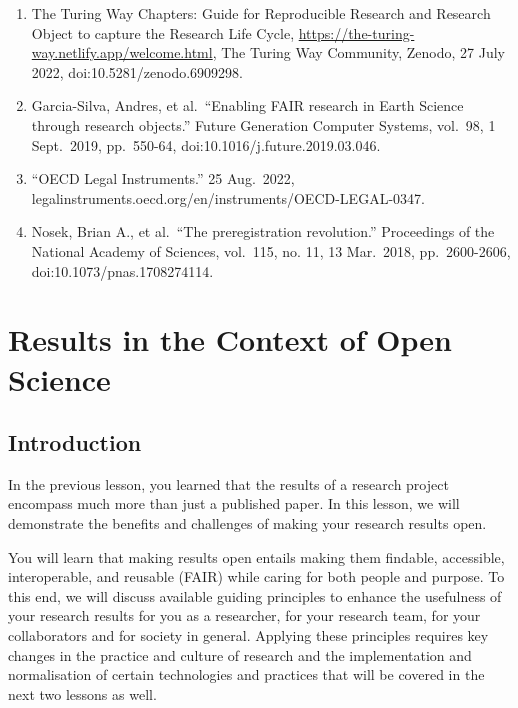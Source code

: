 \documentclass[
  letterpaper,
  DIV=11,
  numbers=noendperiod]{scrreport}
\providecommand{\tightlist}{%
  \setlength{\itemsep}{0pt}\setlength{\parskip}{0pt}}\usepackage{longtable,booktabs,array}
\begin{document}
\begin{enumerate}
\def\labelenumi{\arabic{enumi}.}
\tightlist
\item
  The Turing Way Chapters: Guide for Reproducible Research and Research
  Object to capture the Research Life Cycle,
  \url{https://the-turing-way.netlify.app/welcome.html}, The Turing Way
  Community, Zenodo, 27 July 2022, doi:10.5281/zenodo.6909298.
\item
  Garcia-Silva, Andres, et al.~``Enabling FAIR research in Earth Science
  through research objects.'' Future Generation Computer Systems,
  vol.~98, 1 Sept.~2019, pp.~550-64, doi:10.1016/j.future.2019.03.046.
\item
  ``OECD Legal Instruments.'' 25 Aug.~2022,
  legalinstruments.oecd.org/en/instruments/OECD-LEGAL-0347.
\item
  Nosek, Brian A., et al.~``The preregistration revolution.''
  Proceedings of the National Academy of Sciences, vol.~115, no. 11, 13
  Mar.~2018, pp.~2600-2606, doi:10.1073/pnas.1708274114.
\end{enumerate}

\hypertarget{results-in-the-context-of-open-science}{%
\chapter{Results in the Context of Open
Science}\label{results-in-the-context-of-open-science}}

\hypertarget{introduction-16}{%
\section{Introduction}\label{introduction-16}}

In the previous lesson, you learned that the results of a research
project encompass much more than just a published paper. In this lesson,
we will demonstrate the benefits and challenges of making your research
results open.

You will learn that making results open entails making them findable,
accessible, interoperable, and reusable (FAIR) while caring for both
people and purpose. To this end, we will discuss available guiding
principles to enhance the usefulness of your research results for you as
a researcher, for your research team, for your collaborators and for
society in general. Applying these principles requires key changes in
the practice and culture of research and the implementation and
normalisation of certain technologies and practices that will be covered
in the next two lessons as well.
\end{document}
